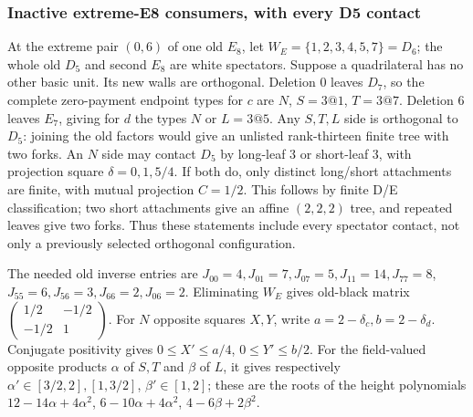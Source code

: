 \documentclass[11pt]{article}
\begin{document}
\subsubsection{Inactive extreme-E8 consumers, with every D5 contact}
At the extreme pair $(0,6)$ of one old $E_8$, let
$W_E=\{1,2,3,4,5,7\}=D_6$; the whole old $D_5$ and second $E_8$
are white spectators. Suppose a quadrilateral has no other basic
unit. Its new walls are orthogonal. Deletion $0$ leaves $D_7$,
so the complete zero-payment endpoint types for $c$ are
$N$, $S=3@1$, $T=3@7$. Deletion $6$ leaves $E_7$, giving for
$d$ the types $N$ or $L=3@5$.
Any $S,T,L$ side is orthogonal to $D_5$: joining the old factors
would give an unlisted rank-thirteen finite tree with two forks.
An $N$ side may contact $D_5$ by long-leaf $3$ or short-leaf $3$,
with projection square $\delta=0,1,5/4$. If both do, only distinct
long/short attachments are finite, with mutual projection $C=1/2$.
This follows by finite D/E classification; two short attachments give
an affine $(2,2,2)$ tree, and repeated leaves give two forks.
Thus these statements include every spectator contact, not only a
previously selected orthogonal configuration.

The needed old inverse entries are
$J_{00}=4,J_{01}=7,J_{07}=5,J_{11}=14,J_{77}=8$,
$J_{55}=6,J_{56}=3,J_{66}=2,J_{06}=2$.
Eliminating $W_E$ gives old-black matrix
$\left(\begin{smallmatrix}1/2&-1/2\\-1/2&1\end{smallmatrix}\right)$.
For $N$ opposite squares $X,Y$, write $a=2-\delta_c,b=2-\delta_d$.
Conjugate positivity gives $0\le X'\le a/4$, $0\le Y'\le b/2$.
For the field-valued opposite products $\alpha$ of $S,T$ and
$\beta$ of $L$, it gives respectively
$\alpha'\in[3/2,2],[1,3/2]$, $\beta'\in[1,2]$;
these are the roots of the height polynomials
$12-14\alpha+4\alpha^2$, $6-10\alpha+4\alpha^2$,
$4-6\beta+2\beta^2$.
\end{document}
